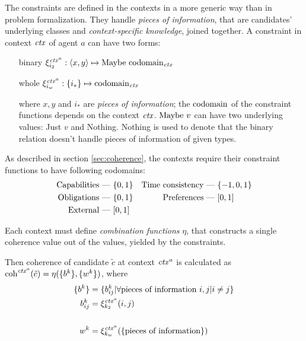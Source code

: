 The constraints are defined in the contexts in a more generic way than in problem
formalization. They handle \emph{pieces of information},
that are candidates' underlying classes and \emph{context-specific knowledge},
joined together.
A constraint in context $\mathit{ctx}$ of agent $a$ can have two forms:
\begin{itemize}[leftmargin=2cm]
  \item[binary] $ \xi_{i_2}^{\mathit{ctx}^a} : \left< x,y \right> \mapsto \mathrm{Maybe~} \mathrm{codomain}_{\mathit{ctx}} $
  \item[whole]  $ \xi_{i_w}^{\mathit{ctx}^a} : \{i_*\} \mapsto \mathrm{codomain}_{\mathit{ctx}} $
  \item[] where $x, y$ and $i_*$ are \emph{pieces of information};
    the $\mathrm{codomain}$ of the constraint functions depends on the context $\mathit{ctx}$.
    $\mathrm{Maybe~} v$ can have two underlying values: Just $v$ and Nothing.
    Nothing is used to denote that the binary relation doesn't handle pieces of information
    of given types.
\end{itemize}

As described in section \ref{sec:coherence}, the contexts require their
constraint functions to have following codomains:
\begin{align*}
   \text{Capabilities}      &\hbox{ --- } \{0, 1\}
&  \text{Time consistency}  &\hbox{ --- } \{-1, 0, 1\}
\\ \text{Obligations}       &\hbox{ --- } \{0, 1\}
&  \text{Preferences}       &\hbox{ --- } [0, 1]
\\ \text{External}          &\hbox{ --- } [0, 1] &
\end{align*}


Each context must define \emph{combination functions} $\eta$, that constructs a
single coherence value out of the values, yielded by the constraints.

Then coherence of candidate $\tilde c$ at context $\mathit{ctx}^a$
is calculated as \\ $\mathrm{coh}^{\mathit{ctx}^a}(\tilde c) = \eta(\{b^k\}, \{w^k\})$, where
\begin{align*}
  \{b^k\}  &= \{b_{ij}^k | \forall \text{pieces of information } i, j | i \not= j \} \\
  b_{ij}^k &= \xi_{k_2}^{\mathit{ctx}^a}(i,j) \\
  &\\
  w^k      &= \xi_{k_w}^{\mathit{ctx}^a}(\{\text{pieces of information}\})
\end{align*}

\todo{}

\medskip

